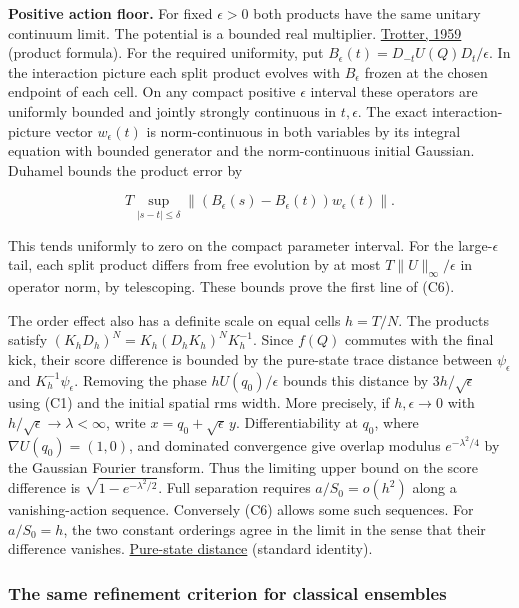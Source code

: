\documentclass[11pt,a4paper]{article}
\begin{document}
\textbf{Positive action floor.} For fixed \(\epsilon>0\) both products
have the same unitary continuum limit. The potential is a bounded real
multiplier.
\href{https://doi.org/10.1090/S0002-9939-1959-0108732-6}{Trotter, 1959}
(product formula). For the required uniformity, put
\(B_\epsilon(t)=D_{-t}U(Q)D_t/\epsilon\). In the interaction picture
each split product evolves with \(B_\epsilon\) frozen at the chosen
endpoint of each cell. On any compact positive \(\epsilon\) interval
these operators are uniformly bounded and jointly strongly continuous in
\(t,\epsilon\). The exact interaction-picture vector \(w_\epsilon(t)\)
is norm-continuous in both variables by its integral equation with
bounded generator and the norm-continuous initial Gaussian. Duhamel
bounds the product error by

\[
 T\sup_{|s-t|\le\delta}
        \|(B_\epsilon(s)-B_\epsilon(t))w_\epsilon(t)\|.
\]

This tends uniformly to zero on the compact parameter interval. For the
large-\(\epsilon\) tail, each split product differs from free evolution
by at most \(T\|U\|_\infty/\epsilon\) in operator norm, by telescoping.
These bounds prove the first line of (C6).

The order effect also has a definite scale on equal cells \(h=T/N\). The
products satisfy \((K_h D_h)^N=K_h(D_h K_h)^N K_h^{-1}\). Since \(f(Q)\)
commutes with the final kick, their score difference is bounded by the
pure-state trace distance between \(\psi_\epsilon\) and
\(K_h^{-1}\psi_\epsilon\). Removing the phase \(hU(q_0)/\epsilon\)
bounds this distance by \(3h/\sqrt\epsilon\) using (C1) and the initial
spatial rms width. More precisely, if \(h,\epsilon\to0\) with
\(h/\sqrt\epsilon\to\lambda<\infty\), write \(x=q_0+\sqrt\epsilon\,y\).
Differentiability at \(q_0\), where \(\nabla U(q_0)=(1,0)\), and
dominated convergence give overlap modulus \(e^{-\lambda^2/4}\) by the
Gaussian Fourier transform. Thus the limiting upper bound on the score
difference is \(\sqrt{1-e^{-\lambda^2/2}}\). Full separation requires
\(a/S_0=o(h^2)\) along a vanishing-action sequence. Conversely (C6)
allows some such sequences. For \(a/S_0=h\), the two constant orderings
agree in the limit in the sense that their difference vanishes.
\href{record-distance-path-length.md}{Pure-state distance} (standard
identity).

\subsubsection{The same refinement criterion for classical
ensembles}\label{the-same-refinement-criterion-for-classical-ensembles}
\end{document}
